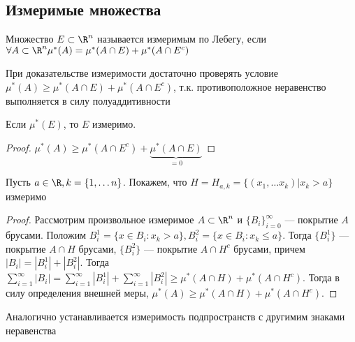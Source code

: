 
\subsection{Измеримые множества}

\begin{definition}
    Множество \(E \subset \R^n\) называется измеримым по Лебегу, если
    \(\forall A \subset \R^n \mu^*(A) = \mu^*(A \cap E) + \mu^*(A \cap E^c)\)
\end{definition}

\begin{note}
    При доказательстве измеримости достаточно проверять условие \(\mu^*(A) \ge \mu^*(A \cap E) + \mu^*(A \cap E^c)\), т.к. противоположное неравенство выполняется в силу полуаддитивности
\end{note}

\begin{proposition}
    Если \(\mu^*(E)\), то \(E\) измеримо.
\end{proposition}
\begin{proof}
    \(\mu^*(A) \ge \mu^*(A \cap E^c) + \underbrace{\mu^*(A \cap E)}_{= 0}\)
\end{proof}

\begin{proposition}
    Пусть  \(a \in \R, k = \{1, \dots n\}\). Покажем, что \(H = H_{a, k} = \{(x_1, \dots x_k) | x_k > a\}\) измеримо
\end{proposition}
\begin{proof}
    Рассмотрим произвольное измеримое \(A \subset \R^n\) и \(\{B_i\}_{i = 0}^\infty\) --- покрытие \(A\) брусами. Положим \(B_i^1 = \{x \in B_i : x_k > a\}, B_i^2 = \{x \in B_i : x_k \le a\}\). Тогда \(\{B_i^1\}\) --- покрытие \(A \cap H\) брусами, \(\{B_i^2\}\) --- покрытие \(A \cap H^c\) брусами, причем \(|B_i| = |B_i^1| + |B_i^2|\). Тогда \(\sum_{i = 1}^\infty |B_i| = \sum_{i = 1}^\infty |B_i^1| + \sum_{i = 1}^\infty |B_i^2| \ge \mu^*(A \cap H) + \mu^*(A \cap H^c)\). Тогда в силу определения внешней меры, \(\mu^*(A) \ge \mu^*(A \cap H) + \mu^*(A \cap H^c)\).
\end{proof}

\begin{note}
    Аналогично устанавливается измеримость подпространств с другимим знаками неравенства
\end{note}

